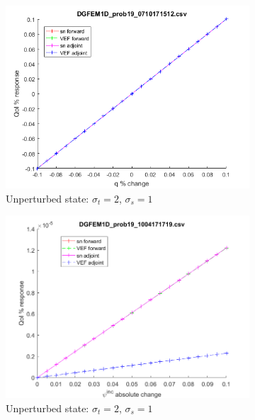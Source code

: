 \documentclass[12pt]{report}
\newcommand{\sigt}{\sigma_t}
\newcommand{\sigs}{\sigma_s}
\begin{document}
\begin{figure}[H]
\label{HomoPertq}
\centering
\begin{subfigure}{.5\textwidth}
  \centering
  \includegraphics[width=.98\linewidth]{figures/19qSens.png}
  \caption{Unperturbed state: $\sigt=2$, $\sigs=1$}
  \label{fig:sfig1}
\end{subfigure}%
\begin{subfigure}{.5\textwidth}
  \centering
  \includegraphics[width=.98\linewidth]{figures/19incSens.png}
  \caption{Unperturbed state: $\sigt=2$, $\sigs=1$}
  \label{fig:sfig4}
\end{subfigure}%
\\
\begin{subfigure}{.5\textwidth}
  \centering

\end{subfigure}
\end{figure}
\end{document}
